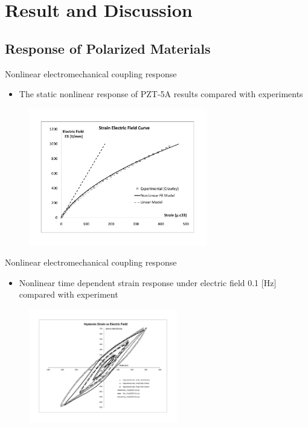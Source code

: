\documentclass{beamer}
\begin{document}
\section{Result and Discussion}
\subsection{Response of Polarized Materials}

\begin{frame}{Nonlinear electromechanical coupling response}
\begin{itemize} \itemsep15ex
\item The static nonlinear response of PZT-5A results compared with experiments \cite{Crawley1990}
  \end{itemize} 
  
\begin{figure}
\centering
\includegraphics[height=6cm]{../images/Static_PZT_5A_FEM_Linear_XP.pdf}
\label{fig:StatilNonLinCrawley}
\end{figure}
\end{frame}


\begin{frame}{Nonlinear electromechanical coupling response}
 \begin{itemize} 
 \item Nonlinear time dependent strain response under electric field 0.1 [Hz] compared with experiment \cite{Crawley1990}
\end{itemize} 
  
\begin{figure}
\includegraphics[height=5cm]{../images/NonLinear_Time_Dependent_Strain_Response.pdf}
\label{fig:TimeDepenNonLinCrawley}
\end{figure}

\end{frame}
\end{document}
